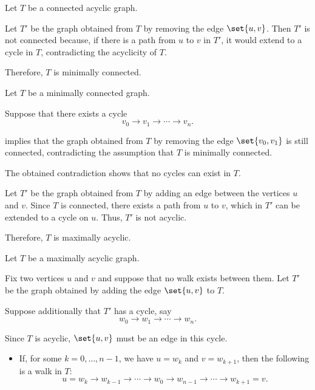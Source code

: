 \begin{defproof}
   Let \( T \) be a connected acyclic graph.

  Let \( T' \) be the graph obtained from \( T \) by removing the edge \( \set{ u, v } \). Then \( T' \) is not connected because, if there is a path from \( u \) to \( v \) in \( T' \), it would extend to a cycle in \( T \), contradicting the acyclicity of \( T \).

  Therefore, \( T \) is minimally connected.

   Let \( T \) be a minimally connected graph.

   Suppose that there exists a cycle
  \begin{equation*}
    v_0 \to v_1 \to \cdots \to v_n.
  \end{equation*}

   implies that the graph obtained from \( T \) by removing the edge \( \set{ v_0, v_1 } \) is still connected, contradicting the assumption that \( T \) is minimally connected.

  The obtained contradiction shows that no cycles can exist in \( T \).

   Let \( T' \) be the graph obtained from \( T \) by adding an edge between the vertices \( u \) and \( v \). Since \( T \) is connected, there exists a path from \( u \) to \( v \), which in \( T' \) can be extended to a cycle on \( u \). Thus, \( T' \) is not acyclic.

  Therefore, \( T \) is maximally acyclic.

   Let \( T \) be a maximally acyclic graph.

  Fix two vertices \( u \) and \( v \) and suppose that no walk exists between them. Let \( T' \) be the graph obtained by adding the edge \( \set{ u, v } \) to \( T \).

  Suppose additionally that \( T' \) has a cycle, say
  \begin{equation*}
    w_0 \to w_1 \to \cdots \to w_n.
  \end{equation*}

  Since \( T \) is acyclic, \( \set{ u, v } \) must be an edge in this cycle.
  \begin{itemize}
    \item If, for some \( k = 0, \ldots, n - 1 \), we have \( u = w_k \) and \( v = w_{k+1} \), then the following is a walk in \( T \):
    \begin{equation*}
      u = w_k \to w_{k-1} \to \cdots \to w_0 \to w_{n-1} \to \cdots \to w_{k+1} = v.
    \end{equation*}


\end{itemize}
\end{defproof}
